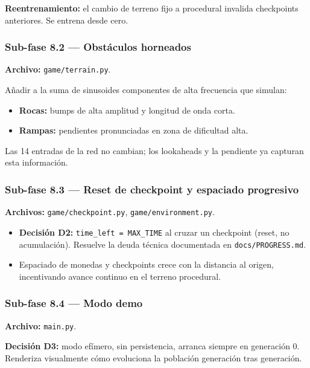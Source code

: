 \documentclass[11pt,a4paper]{article}
\begin{document}
\textbf{Reentrenamiento:} el cambio de terreno fijo a procedural invalida
checkpoints anteriores. Se entrena desde cero.

\subsubsection*{Sub-fase 8.2 --- Obstáculos horneados}

\textbf{Archivo:} \texttt{game/terrain.py}.

Añadir a la suma de sinusoides componentes de alta frecuencia que simulan:
\begin{itemize}
    \item \textbf{Rocas:} bumps de alta amplitud y longitud de onda corta.
    \item \textbf{Rampas:} pendientes pronunciadas en zona de dificultad alta.
\end{itemize}

Las 14 entradas de la red no cambian; los lookaheads y la pendiente ya capturan
esta información.

\subsubsection*{Sub-fase 8.3 --- Reset de checkpoint y espaciado progresivo}

\textbf{Archivos:} \texttt{game/checkpoint.py}, \texttt{game/environment.py}.

\begin{itemize}
    \item \textbf{Decisión D2:} \texttt{time\_left = MAX\_TIME} al cruzar un
          checkpoint (reset, no acumulación). Resuelve la deuda técnica
          documentada en \texttt{docs/PROGRESS.md}.
    \item Espaciado de monedas y checkpoints crece con la distancia al origen,
          incentivando avance continuo en el terreno procedural.
\end{itemize}

\subsubsection*{Sub-fase 8.4 --- Modo demo}

\textbf{Archivo:} \texttt{main.py}.

\textbf{Decisión D3:} modo efímero, sin persistencia, arranca siempre en
generación 0. Renderiza visualmente cómo evoluciona la población generación
tras generación.
\end{document}
